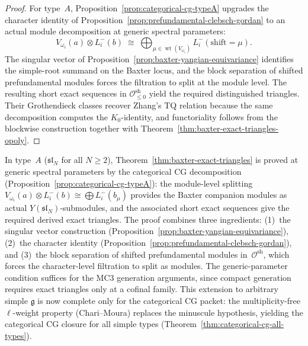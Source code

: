 \begin{proof}
For type~$A$, Proposition~\ref{prop:categorical-cg-typeA} upgrades the
character identity of
Proposition~\ref{prop:prefundamental-clebsch-gordan} to an actual
module decomposition at generic spectral parameters:
\[
V_{\omega_i}(a) \otimes L^-_i(b)
\;\cong\;
\bigoplus_{\mu \in \operatorname{wt}(V_{\omega_i})}
L^-_i(\mathrm{shift} = \mu).
\]
The singular vector of
Proposition~\ref{prop:baxter-yangian-equivariance} identifies the
simple-root summand on the Baxter locus, and the block separation of
shifted prefundamental modules forces the filtration to split at the
module level. The resulting short exact sequences in
$\mathcal{O}^{\mathrm{sh}}_{\leq 0}$ yield the required distinguished
triangles. Their Grothendieck classes recover Zhang's TQ relation
because the same decomposition computes the $K_0$-identity, and
functoriality follows from the blockwise construction together with
Theorem~\ref{thm:baxter-exact-triangles-opoly}.
\end{proof}

\begin{remark}
\label{rem:baxter-exact-triangles-typeA}
In type~$A$ ($\mathfrak{sl}_N$ for all $N \geq 2$),
Theorem~\ref{thm:baxter-exact-triangles} is proved at generic
spectral parameters by the categorical CG decomposition
(Proposition~\ref{prop:categorical-cg-typeA}): the module-level
splitting $V_{\omega_i}(a) \otimes L^-_i(b) \cong
\bigoplus L^-_i(b_\mu)$ provides the Baxter companion modules as
actual $Y(\mathfrak{sl}_N)$-submodules, and the associated short
exact sequences give the required derived exact triangles.
The proof combines three ingredients:
\textup{(1)}~the singular vector construction
(Proposition~\ref{prop:baxter-yangian-equivariance}),
\textup{(2)}~the character identity
(Proposition~\ref{prop:prefundamental-clebsch-gordan}),
and \textup{(3)}~the block separation of shifted prefundamental
modules in~$\mathcal{O}^{\mathrm{sh}}$, which forces the
character-level filtration to split as modules.
The generic-parameter condition suffices for the MC3 generation
arguments, since compact generation requires exact triangles only
at a cofinal family.
This extension to arbitrary simple $\mathfrak{g}$ is now complete only
for the categorical CG packet: the multiplicity-free $\ell$-weight
property (Chari--Moura) replaces the minuscule hypothesis, yielding
the categorical CG closure for all simple types
\textup{(}Theorem~\ref{thm:categorical-cg-all-types}\textup{)}.
\end{remark}

